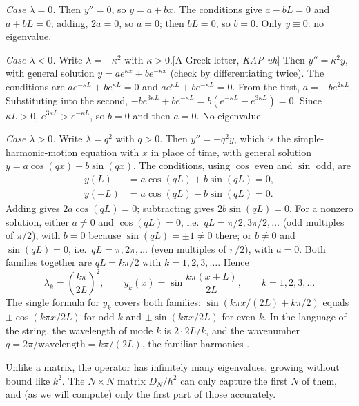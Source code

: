 \emph{Case $\lambda=0$.} Then $y''=0$, so $y=a+bx$. The conditions give $a-bL=0$ and $a+bL=0$; adding, $2a=0$, so $a=0$; then $bL=0$, so $b=0$. Only $y\equiv0$: no eigenvalue.

\emph{Case $\lambda<0$.} Write $\lambda=-\kappa^2$ with $\kappa>0$.[A Greek letter, \emph{KAP-uh}] Then $y''=\kappa^2y$, with general solution $y=ae^{\kappa x}+be^{-\kappa x}$ (check by differentiating twice). The conditions are $ae^{-\kappa L}+be^{\kappa L}=0$ and $ae^{\kappa L}+be^{-\kappa L}=0$. From the first, $a=-be^{2\kappa L}$. Substituting into the second, $-be^{3\kappa L}+be^{-\kappa L}=b(e^{-\kappa L}-e^{3\kappa L})=0$. Since $\kappa L>0$, $e^{3\kappa L}>e^{-\kappa L}$, so $b=0$ and then $a=0$. No eigenvalue.

\emph{Case $\lambda>0$.} Write $\lambda=q^2$ with $q>0$. Then $y''=-q^2y$, which is the simple-harmonic-motion equation with $x$ in place of time, with general solution $y=a\cos(qx)+b\sin(qx)$. The conditions, using $\cos$ even and $\sin$ odd, are
\begin{align}
y(L)&=a\cos(qL)+b\sin(qL)=0,\\
y(-L)&=a\cos(qL)-b\sin(qL)=0.
\end{align}
Adding gives $2a\cos(qL)=0$; subtracting gives $2b\sin(qL)=0$. For a nonzero solution, either $a\ne0$ and $\cos(qL)=0$, i.e.\ $qL=\pi/2,3\pi/2,\dots$ (odd multiples of $\pi/2$), with $b=0$ because $\sin(qL)=\pm1\ne0$ there; or $b\ne0$ and $\sin(qL)=0$, i.e.\ $qL=\pi,2\pi,\dots$ (even multiples of $\pi/2$), with $a=0$. Both families together are $qL=k\pi/2$ with $k=1,2,3,\dots$. Hence
\begin{equation}
\boxed{\lambda_k=\left(\frac{k\pi}{2L}\right)^2,\qquad y_k(x)=\sin\frac{k\pi(x+L)}{2L},\qquad k=1,2,3,\dots}
\label{eq:eigen-string-sol}
\end{equation}
The single formula for $y_k$ covers both families: $\sin(k\pi x/(2L)+k\pi/2)$ equals $\pm\cos(k\pi x/2L)$ for odd $k$ and $\pm\sin(k\pi x/2L)$ for even $k$. In the language of the string, the wavelength of mode $k$ is $2\cdot2L/k$, and the wavenumber $q=2\pi/\text{wavelength}=k\pi/(2L)$, the familiar harmonics \cite{hrw}.

Unlike a matrix, the operator has infinitely many eigenvalues, growing without bound like $k^2$. The $N\times N$ matrix $D_N/h^2$ can only capture the first $N$ of them, and (as we will compute) only the first part of those accurately.

